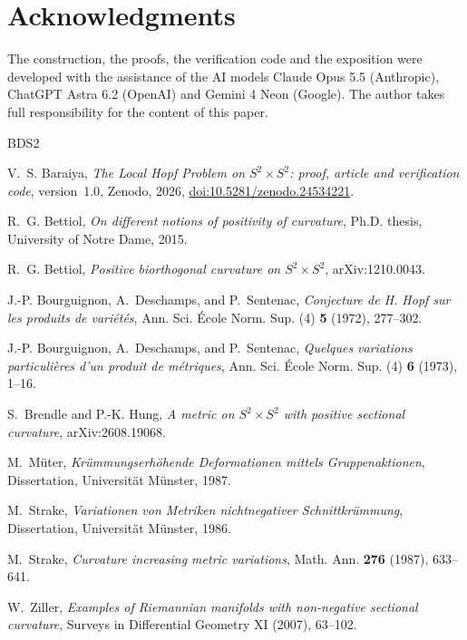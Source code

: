 \documentclass[11pt]{amsart}
\theoremstyle{definition}
\theoremstyle{remark}
\newcommand{\codedoi}{\href{https://doi.org/10.5281/zenodo.24534221}{doi:10.5281/zenodo.24534221}}
\begin{document}
\section*{Acknowledgments}
The construction, the proofs, the verification code and the exposition were developed with the assistance of the AI models Claude Opus 5.5 (Anthropic), ChatGPT Astra 6.2 (OpenAI) and Gemini 4 Neon (Google). The author takes full responsibility for the content of this paper.

\begin{thebibliography}{BDS2}

V.~S. Baraiya, \emph{The Local Hopf Problem on $S^2\times S^2$: proof, article and verification code}, version~1.0, Zenodo, 2026, \codedoi.

R.~G. Bettiol, \emph{On different notions of positivity of curvature}, Ph.D. thesis, University of Notre Dame, 2015.

R.~G. Bettiol, \emph{Positive biorthogonal curvature on $S^2\times S^2$}, arXiv:1210.0043.

J.-P. Bourguignon, A.~Deschamps, and P.~Sentenac, \emph{Conjecture de H. Hopf sur les produits de vari\'et\'es}, Ann. Sci. \'Ecole Norm. Sup. (4) \textbf{5} (1972), 277--302.

J.-P. Bourguignon, A.~Deschamps, and P.~Sentenac, \emph{Quelques variations particuli\`eres d'un produit de m\'etriques}, Ann. Sci. \'Ecole Norm. Sup. (4) \textbf{6} (1973), 1--16.

S.~Brendle and P.-K. Hung, \emph{A metric on $S^2\times S^2$ with positive sectional curvature}, arXiv:2608.19068.

M.~M\"uter, \emph{Kr\"ummungserh\"ohende Deformationen mittels Gruppenaktionen}, Dissertation, Universit\"at M\"unster, 1987.

M.~Strake, \emph{Variationen von Metriken nichtnegativer Schnittkr\"ummung}, Dissertation, Universit\"at M\"unster, 1986.

M.~Strake, \emph{Curvature increasing metric variations}, Math. Ann. \textbf{276} (1987), 633--641.

W.~Ziller, \emph{Examples of Riemannian manifolds with non-negative sectional curvature}, Surveys in Differential Geometry XI (2007), 63--102.

\end{thebibliography}
\end{document}

